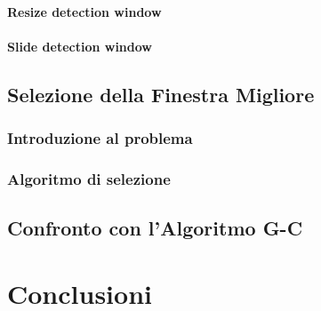             \subsubsection{Resize detection window}
            \subsubsection{Slide detection window}
    \section{Selezione della Finestra Migliore} %
    \label{sec:best_detection_window}
        \subsection{Introduzione al problema}
        \subsection{Algoritmo di selezione}
    \section{Confronto con l'Algoritmo G-C} %
    \label{sec:gc_algorithm_comparison}

\chapter{Conclusioni}

